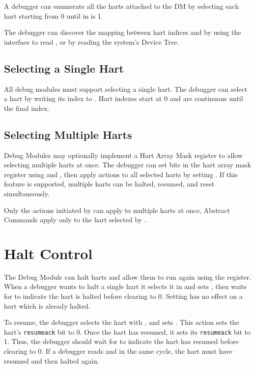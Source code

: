 A debugger can enumerate all the harts
attached to the DM by selecting each hart starting from 0
until \Fanynonexistent in \Rdmstatus is 1.

The debugger can discover the mapping between hart indices and
\Rmhartid by using the interface to read \Rmhartid, or by
reading the system's Device Tree.

\subsection {Selecting a Single Hart}

All debug modules must support selecting a single hart.
The debugger can select a hart by writing its index to \Fhartsel.
Hart indexes start at 0 and are continuous until the final index.

\subsection {Selecting Multiple Harts}

Debug Modules may optionally implement a Hart Array Mask register to allow
selecting multiple harts at once. The debugger can set bits in the hart array mask register
using \Rhawindowsel and \Rhawindow, then apply actions to all selected harts
by setting \Fhasel. If this feature is supported, multiple harts can be
halted, resumed, and reset simultaneously.

Only the actions initiated by \Rdmcontrol can apply to multiple harts
at once, Abstract Commands apply only to the hart selected by
\Fhartsel.

\section{Halt Control} \label{haltcontrol}

The Debug Module can halt harts and allow them to run again using
the \Rdmcontrol register.
When a debugger wants to halt a single hart it selects it in \Fhartsel
and sets \Fhaltreq, then waits
for \Fallhalted to indicate the hart is halted before clearing \Fhaltreq
to 0. Setting \Fhaltreq has no effect on a hart which is already halted.

To resume, the debugger selects the hart with \Fhartsel,
and sets \Fresumereq. This action sets the hart's
{\tt resumeack} bit to 0. Once the hart has resumed, it
sets its {\tt resumeack} bit to 1. Thus, the
debugger should wait for \Fallresumeack to indicate the
hart has resumed before clearing \Fresumereq to 0.
If a debugger reads \Fallresumeack
and \Fallhalted in the same cycle, the hart must have resumed
and then halted again.

